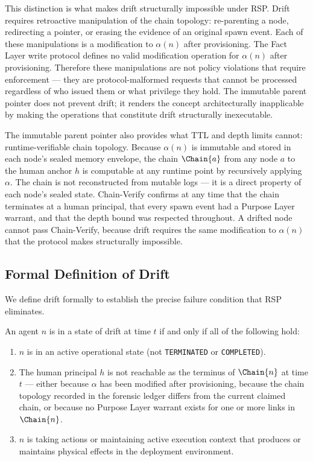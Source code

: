 This distinction is what makes drift structurally impossible under RSP. Drift requires retroactive manipulation of the chain topology: re-parenting a node, redirecting a pointer, or erasing the evidence of an original spawn event. Each of these manipulations is a modification to $\alpha(n)$ after provisioning. The Fact Layer write protocol defines no valid modification operation for $\alpha(n)$ after provisioning. Therefore these manipulations are not policy violations that require enforcement — they are protocol-malformed requests that cannot be processed regardless of who issued them or what privilege they hold. The immutable parent pointer does not prevent drift; it renders the concept architecturally inapplicable by making the operations that constitute drift structurally inexecutable.

The immutable parent pointer also provides what TTL and depth limits cannot: runtime-verifiable chain topology. Because $\alpha(n)$ is immutable and stored in each node's sealed memory envelope, the chain $\Chain{a}$ from any node $a$ to the human anchor $h$ is computable at any runtime point by recursively applying $\alpha$. The chain is not reconstructed from mutable logs — it is a direct property of each node's sealed state. Chain-Verify confirms at any time that the chain terminates at a human principal, that every spawn event had a Purpose Layer warrant, and that the depth bound was respected throughout. A drifted node cannot pass Chain-Verify, because drift requires the same modification to $\alpha(n)$ that the protocol makes structurally impossible.

\subsection{Formal Definition of Drift}
\label{sec:drift-definition}

We define drift formally to establish the precise failure condition that RSP eliminates.

\begin{dfn}[Drift]
\label{dfn:drift}
An agent $n$ is in a state of drift at time $t$ if and only if all of the following hold:

\begin{enumerate}
    \item[(D1)] $n$ is in an active operational state (not \texttt{TERMINATED} or \texttt{COMPLETED}).
    \item[(D2)] The human principal $h$ is not reachable as the terminus of $\Chain{n}$ at time $t$ — either because $\alpha$ has been modified after provisioning, because the chain topology recorded in the forensic ledger differs from the current claimed chain, or because no Purpose Layer warrant exists for one or more links in $\Chain{n}$.
    \item[(D3)] $n$ is taking actions or maintaining active execution context that produces or maintains physical effects in the deployment environment.
\end{enumerate}
\end{dfn}

